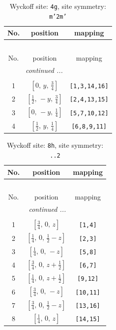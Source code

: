 \documentclass[fleqn,8pt]{jsarticle}
\begin{document}
\renewcommand{\arraystretch}{1.2}
\begin{longtable}{ccc}
\caption{Wyckoff site: {\tt 4g}, site symmetry: {\tt m'2m'}}
 \\
 \hline \hline
No. & position & mapping \\ \hline \endfirsthead

\multicolumn{2}{l}{\tablename\ \thetable{}} \\
 \hline \hline
No. & position & mapping \\ \hline \endhead

 \hline \hline
\multicolumn{2}{r}{\footnotesize\it continued ...} \\ \endfoot

 \hline \hline
\multicolumn{2}{r}{} \\ \endlastfoot

1 & $\left[ 0,\, y,\, \frac{3}{4} \right]$ & {\tt [1,3,14,16]} \\ \hline
2 & $\left[ \frac{1}{2},\, - y,\, \frac{3}{4} \right]$ & {\tt [2,4,13,15]} \\ \hline
3 & $\left[ 0,\, - y,\, \frac{1}{4} \right]$ & {\tt [5,7,10,12]} \\ \hline
4 & $\left[ \frac{1}{2},\, y,\, \frac{1}{4} \right]$ & {\tt [6,8,9,11]} \\
\end{longtable}
\renewcommand{\arraystretch}{1.2}
\begin{longtable}{ccc}
\caption{Wyckoff site: {\tt 8h}, site symmetry: {\tt ..2}}
 \\
 \hline \hline
No. & position & mapping \\ \hline \endfirsthead

\multicolumn{2}{l}{\tablename\ \thetable{}} \\
 \hline \hline
No. & position & mapping \\ \hline \endhead

 \hline \hline
\multicolumn{2}{r}{\footnotesize\it continued ...} \\ \endfoot

 \hline \hline
\multicolumn{2}{r}{} \\ \endlastfoot

1 & $\left[ \frac{3}{4},\, 0,\, z \right]$ & {\tt [1,4]} \\ \hline
2 & $\left[ \frac{1}{4},\, 0,\, \frac{1}{2} - z \right]$ & {\tt [2,3]} \\ \hline
3 & $\left[ \frac{1}{4},\, 0,\, - z \right]$ & {\tt [5,8]} \\ \hline
4 & $\left[ \frac{3}{4},\, 0,\, z + \frac{1}{2} \right]$ & {\tt [6,7]} \\ \hline
5 & $\left[ \frac{1}{4},\, 0,\, z + \frac{1}{2} \right]$ & {\tt [9,12]} \\ \hline
6 & $\left[ \frac{3}{4},\, 0,\, - z \right]$ & {\tt [10,11]} \\ \hline
7 & $\left[ \frac{3}{4},\, 0,\, \frac{1}{2} - z \right]$ & {\tt [13,16]} \\ \hline
8 & $\left[ \frac{1}{4},\, 0,\, z \right]$ & {\tt [14,15]} \\
\end{longtable}
\end{document}
